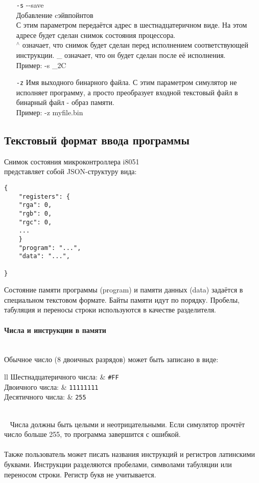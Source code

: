 \begin{enumerate}
	\item[{\tt -s}] {-}-save \\
	Добавление cэйвпойнтов \\
	С этим параметром передаётся адрес в шестнадцатеричном виде. На этом адресе будет сделан снимок состояния процессора. \\
	$^\wedge$ означает, что снимок будет сделан перед исполнением соответствующей инструкции. \_ означает, что он будет сделан после её исполнения. \\
	Пример: -s {\_}2C
	
	\item[{\tt -z}]
	Имя выходного бинарного файла.
	С этим параметром симулятор не исполняет программу, а просто преобразует входной текстовый файл в бинарный файл - образ памяти.\\
	Пример: -z myfile.bin
\end{enumerate}

\subsection{Текстовый формат ввода программы}
Снимок состояния микроконтроллера i8051 \\ представляет собой JSON-структуру вида:\\
\begin{lstlisting}
{
	"registers": {
	"rga": 0,
	"rgb": 0,
	"rgc": 0,
	...
	}
	"program": "...",
	"data": "...",
	
}
\end{lstlisting}
Состояние памяти программы (program) и памяти данных (data) задаётся в специальном текстовом формате.
Байты памяти идут по порядку. Пробелы, табуляция и переносы строки используются в качестве разделителя.

\paragraph{Числа и инструкции в памяти}~\\
Обычное число (8 двоичных разрядов) может быть записано в виде:
~
~\\[3mm]
\begin{tabular}{{l}{l}}
	Шестнадцатеричного числа: & {\tt\large \#FF} \\[2mm]
	Двоичного числа:          & {\tt\large 11111111} \\[2mm]
	Десятичного числа:        & {\tt\large *255} \\
\end{tabular} \\[3mm]
~
Числа должны быть целыми и неотрицательными. Если симулятор прочтёт число больше 255, то программа завершится с ошибкой.\\
~\\
Также пользователь может писать названия инструкций и регистров латинскими буквами. Инструкции разделяются пробелами, символами табуляции или переносом строки. Регистр букв не учитывается.\\


